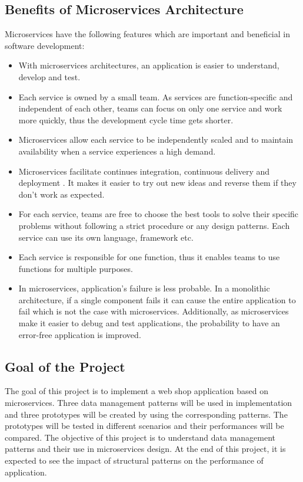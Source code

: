 \documentclass{article}
\begin{document}
\subsection{Benefits of Microservices Architecture}

Microservices have the following features which are important and beneficial in software development\cite{intro2}:

\begin{itemize}
    \item With microservices architectures, an application is easier to understand, develop and test.
    \item Each service is owned by a small team. As services are function-specific and independent of each other, teams can focus on only one service and work more quickly, thus the development cycle time gets shorter.  
    \item Microservices allow each service to be independently scaled and to maintain availability when a service experiences a high demand.
	\item Microservices facilitate continues integration, continuous delivery and deployment \cite{wiki}. It makes it easier to try out new ideas and reverse them if they don’t work as expected.
	\item For each service, teams are free to choose the best tools to solve their specific problems without following a strict procedure or any design patterns. Each service can use its own language, framework etc.
	\item Each service is responsible for one function, thus it enables teams to use functions for multiple purposes. 
	\item In microservices, application’s failure is less probable. In a monolithic architecture, if a single component fails it can cause the entire application to fail which is not the case with microservices. Additionally, as microservices make it easier to debug and test applications, the probability to have an error-free application is improved\cite{cio}.

\end{itemize}

\subsection{Goal of the Project}
The goal of this project is to implement a web shop application based on microservices. Three data management patterns will be used in implementation and three prototypes will be created by using the corresponding patterns. The prototypes will be tested in different scenarios and their performances will be compared. The objective of this project is to understand data management patterns and their use in microservices design. At the end of this project, it is expected to see the impact of structural patterns on the performance of application.
\pagebreak
\end{document}
